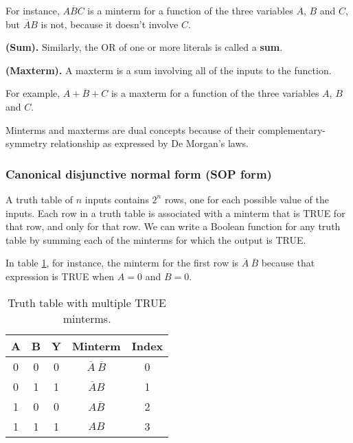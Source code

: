 For instance, $A\overline{B}C$ is a minterm for a function of the three variables $A$, $B$ and $C$, but $\overline{A}B$ is not, because it doesn't involve $C$.

\begin{definition}
    \textbf{(Sum).} Similarly, the OR of one or more literals is called a \textbf{sum}.
\end{definition}
\begin{definition}
    \textbf{(Maxterm).} A maxterm is a sum involving all of the inputs to the function. 
\end{definition}

For example, $A + \overline{B} + C$ is a maxterm for a function of the three variables $A$, $B$ and $C$.

\begin{note}
    Minterms and maxterms are dual concepts because of their complementary-symmetry relationship as expressed by De Morgan's laws.
\end{note}

\subsubsection{Canonical disjunctive normal form (SOP form)}
A truth table of $n$ inputs contains $2^n$ rows, one for each possible value of the inputs. Each row in a truth table is associated with a minterm that is TRUE for that row, and only for that row. We can write a Boolean function for any truth table by summing each of the minterms for which the output is TRUE.

In table \ref{1:lf:sop-tt}, for instance, the minterm for the first row is $\overline{A}\ \overline{B}$ because that expression is TRUE when $A = 0$ and $B = 0$. 
\bgroup
\def\arraystretch{1.3}
\begin{table}[h!]
\centering
\begin{tabular}{|c|c|c|c|c|}
    \hline
    \textbf{A} & \textbf{B} & \textbf{Y} & \textbf{Minterm} & \textbf{Index} \\
    \hline
    0 & 0 & 0 & $\overline{A}\ \overline{B}$ & 0 \\
    0 & 1 & 1 & $\overline{A}B$ & 1 \\
    1 & 0 & 0 & $A\overline{B}$ & 2\\
    1 & 1 & 1 & $AB$ & 3 \\
    \hline
\end{tabular}
\caption{Truth table with multiple TRUE minterms.}
\label{1:lf:sop-tt}
\end{table}
\egroup


